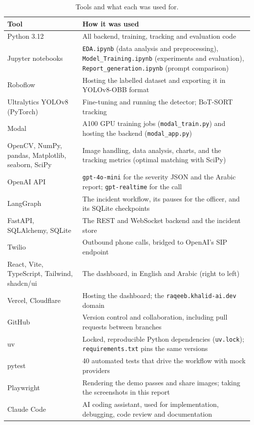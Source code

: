 \documentclass[11pt,a4paper]{article}
\newcommand{\code}[1]{\texttt{#1}}
\begin{document}
\begin{table}[H]
\centering
\small
\begin{tabularx}{\textwidth}{@{}P{4.2cm}L@{}}
\toprule
Tool & How it was used \\
\midrule
Python 3.12 & All backend, training, tracking and evaluation code \\
Jupyter notebooks & \code{EDA.ipynb} (data analysis and preprocessing), \code{Model\_Training.ipynb} (experiments and evaluation), \code{Report\_generation.ipynb} (prompt comparison) \\
Roboflow & Hosting the labelled dataset and exporting it in YOLOv8-OBB format \\
Ultralytics YOLOv8 (PyTorch) & Fine-tuning and running the detector; BoT-SORT tracking \\
Modal & A100 GPU training jobs (\code{modal\_train.py}) and hosting the backend (\code{modal\_app.py}) \\
OpenCV, NumPy, pandas, Matplotlib, seaborn, SciPy & Image handling, data analysis, charts, and the tracking metrics (optimal matching with SciPy) \\
OpenAI API & \code{gpt-4o-mini} for the severity JSON and the Arabic report; \code{gpt-realtime} for the call \\
LangGraph & The incident workflow, its pauses for the officer, and its SQLite checkpoints \\
FastAPI, SQLAlchemy, SQLite & The REST and WebSocket backend and the incident store \\
Twilio & Outbound phone calls, bridged to OpenAI's SIP endpoint \\
React, Vite, TypeScript, Tailwind, shadcn/ui & The dashboard, in English and Arabic (right to left) \\
Vercel, Cloudflare & Hosting the dashboard; the \code{raqeeb.khalid-ai.dev} domain \\
GitHub & Version control and collaboration, including pull requests between branches \\
uv & Locked, reproducible Python dependencies (\code{uv.lock}); \code{requirements.txt} pins the same versions \\
pytest & 40 automated tests that drive the workflow with mock providers \\
Playwright & Rendering the demo passes and share images; taking the screenshots in this report \\
Claude Code & AI coding assistant, used for implementation, debugging, code review and documentation \\
\bottomrule
\end{tabularx}
\caption{Tools and what each was used for.}
\end{table}
\end{document}
